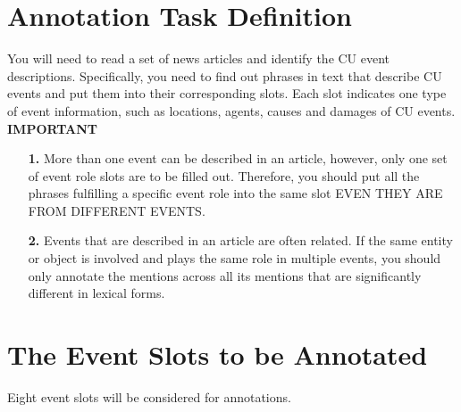 \section{Annotation Task Definition}

You will need to read a set of news articles and identify the CU event 
descriptions. Specifically, you need to find out phrases in text that 
describe CU events and put them into their corresponding slots. 
Each slot indicates one type of event information, such as locations, 
agents, causes and damages of CU events.\\

{\bf IMPORTANT}
\begin{enumerate}
\item[{\bf 1.}] More than one event can be described in an article, however, only one set of 
event role slots are to be filled out. Therefore, you should put all the phrases 
fulfilling a specific event role into the same slot EVEN THEY ARE FROM DIFFERENT EVENTS.
\item[{\bf 2.}] Events that are described in an article are often related. If the same entity 
or object is involved and plays the same role in multiple events, you should only 
annotate the mentions across all its mentions that are significantly different in 
lexical forms.
\end{enumerate}



\section{The Event Slots to be Annotated}
Eight event slots will be considered for annotations.\\

